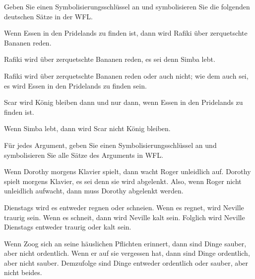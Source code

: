 \solutions
\problempart 
Geben Sie einen Symbolisierungsschlüssel an und symbolisieren Sie die folgenden deutschen Sätze in der WFL.
\begin{earg}
\item Wenn Essen in den Pridelands zu finden ist, dann wird Rafiki über zerquetschte Bananen reden.
\item Rafiki wird über zerquetschte Bananen reden, es sei denn Simba lebt.
\item Rafiki wird über zerquetschte Bananen reden oder auch nicht; wie dem auch sei, es wird Essen in den Pridelands zu finden sein.
\item Scar wird König bleiben dann und nur dann, wenn Essen in den Pridelands zu finden ist.
\item Wenn Simba lebt, dann wird Scar nicht König bleiben.
\end{earg}

\problempart
Für jedes Argument, geben Sie einen Symbolisierungsschlüssel an und symbolisieren Sie alle Sätze des Arguments in WFL.
\begin{earg}
\item Wenn Dorothy morgens Klavier spielt, dann wacht Roger unleidlich auf. Dorothy spielt morgens Klavier, es sei denn sie wird abgelenkt. Also, wenn Roger nicht unleidlich aufwacht, dann muss Dorothy abgelenkt werden.
\item Dienstags wird es entweder regnen oder schneien. Wenn es regnet, wird Neville traurig sein. Wenn es schneit, dann wird Neville kalt sein. Folglich wird Neville Dienstags entweder traurig oder kalt sein.
\item Wenn Zoog sich an seine häuslichen Pflichten erinnert, dann sind Dinge sauber, aber nicht ordentlich. Wenn er auf sie vergessen hat, dann sind Dinge ordentlich, aber nicht sauber. Demzufolge sind Dinge entweder ordentlich oder sauber, aber nicht beides.
\end{earg}

